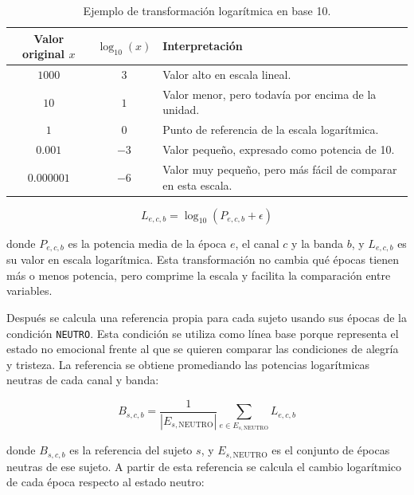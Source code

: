 \begin{table}[H]
\centering
\small
\caption{Ejemplo de transformación logarítmica en base 10.}
\label{tab:ejemplo_log10}
\begin{tabular}{|c|c|p{6.4cm}|}
\hline
\textbf{Valor original \(x\)} & \textbf{\(\log_{10}(x)\)} & \textbf{Interpretación} \\
\hline
\(1000\) & \(3\) & Valor alto en escala lineal. \\
\hline
\(10\) & \(1\) & Valor menor, pero todavía por encima de la unidad. \\
\hline
\(1\) & \(0\) & Punto de referencia de la escala logarítmica. \\
\hline
\(0.001\) & \(-3\) & Valor pequeño, expresado como potencia de 10. \\
\hline
\(0.000001\) & \(-6\) & Valor muy pequeño, pero más fácil de comparar en esta escala. \\
\hline
\end{tabular}
\end{table}

\begin{myequation}[H]
\[
L_{e,c,b} = \log_{10}(P_{e,c,b} + \epsilon)
\]
\caption{Transformación logarítmica de la potencia espectral.}
\label{eq:log_psd}
\end{myequation}

donde \(P_{e,c,b}\) es la potencia media de la época \(e\), el canal \(c\) y la banda \(b\), y \(L_{e,c,b}\) es su valor en escala logarítmica. Esta transformación no cambia qué épocas tienen más o menos potencia, pero comprime la escala y facilita la comparación entre variables.

Después se calcula una referencia propia para cada sujeto usando sus épocas de la condición \texttt{NEUTRO}. Esta condición se utiliza como línea base porque representa el estado no emocional frente al que se quieren comparar las condiciones de alegría y tristeza. La referencia se obtiene promediando las potencias logarítmicas neutras de cada canal y banda:

\begin{myequation}[H]
\[
B_{s,c,b} = \frac{1}{|E_{s,\mathrm{NEUTRO}}|}\sum_{e \in E_{s,\mathrm{NEUTRO}}} L_{e,c,b}
\]
\caption{Referencia neutra de un sujeto para cada canal y banda.}
\label{eq:baseline_neutro}
\end{myequation}

donde \(B_{s,c,b}\) es la referencia del sujeto \(s\), y \(E_{s,\mathrm{NEUTRO}}\) es el conjunto de épocas neutras de ese sujeto. A partir de esta referencia se calcula el cambio logarítmico de cada época respecto al estado neutro:

